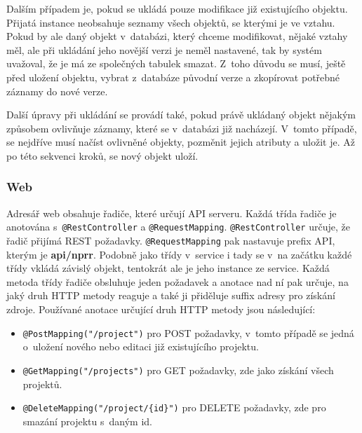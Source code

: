 Dalším případem je, pokud se ukládá pouze modifikace již existujícího objektu. Přijatá instance neobsahuje seznamy všech objektů, se kterými je ve vztahu. Pokud by ale daný objekt v~databázi, který chceme modifikovat, nějaké vztahy měl, ale při ukládání jeho novější verzi je neměl nastavené, tak by systém uvažoval, že je má ze společných tabulek smazat. Z~toho důvodu se musí, ještě před uložení objektu, vybrat z~databáze původní verze a zkopírovat potřebné záznamy do nové verze.

Další úpravy při ukládání se provádí také, pokud právě ukládaný objekt nějakým způsobem ovlivňuje záznamy, které se v~databázi již nacházejí. V~tomto případě, se nejdříve musí načíst ovlivněné objekty, pozměnit jejich atributy a uložit je. Až po této sekvenci kroků, se nový objekt uloží.


\subsubsection *{Web}

Adresář web obsahuje řadiče, které určují API serveru. Každá třída řadiče je anotována s~\texttt{@RestController} a \texttt{@RequestMapping}. \texttt{@RestController} určuje, že řadič přijímá REST požadavky. \texttt{@RequestMapping} pak nastavuje prefix API, kterým je \textbf{api/nprr}. Podobně jako třídy v~service i tady se v~na začátku každé třídy vkládá závislý objekt, tentokrát ale je jeho instance ze service. Každá metoda třídy řadiče obsluhuje jeden požadavek a anotace nad ní pak určuje, na jaký druh HTTP metody reaguje a také ji přiděluje suffix adresy pro získání zdroje. Používané anotace určující druh HTTP metody jsou následující:

\begin{itemize}
    \item \texttt{@PostMapping("/project")} pro POST požadavky, v~tomto případě se jedná o~uložení nového nebo editaci již existujícího projektu.
    \item \texttt{@GetMapping("/projects")} pro GET požadavky, zde jako získání všech projektů.
    \item \texttt{@DeleteMapping("/project/\{id\}")} pro DELETE požadavky, zde pro smazání projektu s~daným id.
\end{itemize}

